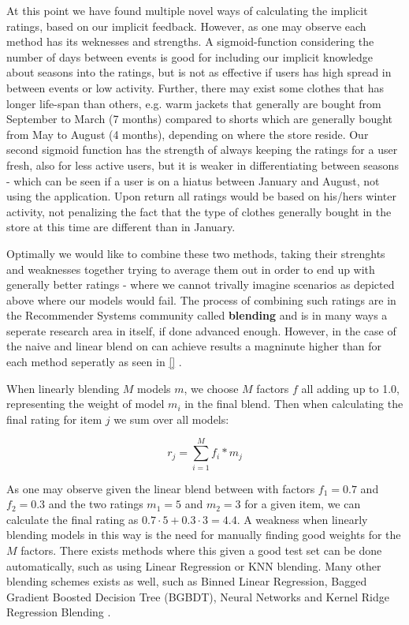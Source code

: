 At this point we have found multiple novel ways of calculating the
implicit ratings, based on our implicit feedback. However, as one may observe
each method has its weknesses and strengths. A sigmoid-function considering the
number of days between events is good for including our implicit knowledge
about seasons into the ratings, but is not as effective if users has high
spread in between events or low activity. Further, there may exist some clothes
that has longer life-span than others, e.g. warm jackets that generally are
bought from September to March (7 months) compared to shorts which are
generally bought from May to August (4 months), depending on where the store
reside. Our second sigmoid function has the strength of always keeping the
ratings for a user fresh, also for less active users, but it is weaker in
differentiating between seasons - which can be seen if a user is on a hiatus
between January and August, not using the application. Upon return all ratings
would be based on his/hers winter activity, not penalizing the fact that the
type of clothes generally bought in the store at this time are different than
in January.

Optimally we would like to combine these two methods, taking their strenghts
and weaknesses together trying to average them out in order to end up with
generally better ratings - where we cannot trivally imagine scenarios as
depicted above where our models would fail. The process of combining such
ratings are in the Recommender Systems community called \textbf{blending} and
is in many ways a seperate research area in itself, if done advanced enough.
However, in the case of the naive and linear blend on can achieve results a
magninute higher than for each method seperatly as seen in \ref{}
.

When linearly blending $M$ models $m$, we choose $M$ factors $f$ all adding up
to 1.0, representing the weight of model $m_{i}$ in the final blend. Then when
calculating the final rating for item $j$ we sum over all models:

\begin{equation}
  r_j = \sum _{i=1}^{M} f_{i} * m_{j}
\end{equation}

As one may observe given the linear blend between with factors $f_1 = 0.7$ and
$f_2 = 0.3$ and the two ratings $m_1 = 5$ and $m_2 = 3$ for a given item, we
can calculate the final rating as $0.7 \cdot 5 + 0.3 \cdot 3 = 4.4$. A weakness
when linearly blending models in this way is the need for manually finding good
weights for the $M$ factors. There exists methods where this given a good test
set can be done automatically, such as using Linear Regression or KNN blending.
Many other blending schemes exists as well, such as Binned Linear Regression,
Bagged Gradient Boosted Decision Tree (BGBDT), Neural Networks and Kernel Ridge
Regression Blending \cite{jahrer2010combining} \cite{toscher2009bigchaos}.

